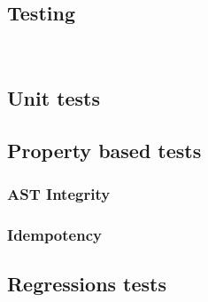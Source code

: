 \subsection{Testing}~\label{sec:testing}
\subsection{Unit tests}
\subsection{Property based tests}
\subsubsection{AST Integrity}
\subsubsection{Idempotency}
\subsection{Regressions tests}
